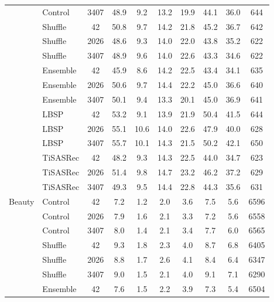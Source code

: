 \begin{longtable}{@{}llS[table-format=4.0,group-digits=false]S[table-format=2.1]S[table-format=2.1]S[table-format=2.1]S[table-format=2.1]S[table-format=2.1]S[table-format=2.1]S[table-format=5.0]@{}}
 & Control & 3407 & 48.9 & 9.2 & 13.2 & 19.9 & 44.1 & 36.0 & 644\\ %
 & Shuffle & 42 & 50.8 & 9.7 & 14.2 & 21.8 & 45.2 & 36.7 & 642\\ %
 & Shuffle & 2026 & 48.6 & 9.3 & 14.0 & 22.0 & 43.8 & 35.2 & 622\\ %
 & Shuffle & 3407 & 48.9 & 9.6 & 14.0 & 22.6 & 43.3 & 34.6 & 622\\ %
 & Ensemble & 42 & 45.9 & 8.6 & 14.2 & 22.5 & 43.4 & 34.1 & 635\\ %
 & Ensemble & 2026 & 50.6 & 9.7 & 14.4 & 22.2 & 45.0 & 36.6 & 640\\ %
 & Ensemble & 3407 & 50.1 & 9.4 & 13.3 & 20.1 & 45.0 & 36.9 & 641\\ %
 & LBSP & 42 & 53.2 & 9.1 & 13.9 & 21.9 & 50.4 & 41.5 & 644\\ %
 & LBSP & 2026 & 55.1 & 10.6 & 14.0 & 22.6 & 47.9 & 40.0 & 628\\ %
 & LBSP & 3407 & 55.7 & 10.1 & 14.3 & 21.5 & 50.2 & 42.1 & 650\\ %
 & TiSASRec & 42 & 48.2 & 9.3 & 14.3 & 22.5 & 44.0 & 34.7 & 623\\ %
 & TiSASRec & 2026 & 51.4 & 9.8 & 14.7 & 23.2 & 46.2 & 37.2 & 629\\ %
 & TiSASRec & 3407 & 49.3 & 9.5 & 14.4 & 22.8 & 44.3 & 35.6 & 631\\ %
\midrule
Beauty & Control & 42 & 7.2 & 1.2 & 2.0 & 3.6 & 7.5 & 5.6 & 6596\\ %
 & Control & 2026 & 7.9 & 1.6 & 2.1 & 3.3 & 7.2 & 5.6 & 6558\\ %
 & Control & 3407 & 8.0 & 1.4 & 2.1 & 3.4 & 7.7 & 6.0 & 6565\\ %
 & Shuffle & 42 & 9.3 & 1.8 & 2.3 & 4.0 & 8.7 & 6.8 & 6405\\ %
 & Shuffle & 2026 & 8.8 & 1.7 & 2.6 & 4.1 & 8.4 & 6.4 & 6347\\ %
 & Shuffle & 3407 & 9.0 & 1.5 & 2.1 & 4.0 & 9.1 & 7.1 & 6290\\ %
 & Ensemble & 42 & 7.6 & 1.5 & 2.2 & 3.9 & 7.3 & 5.4 & 6504\\ %

\end{longtable}
